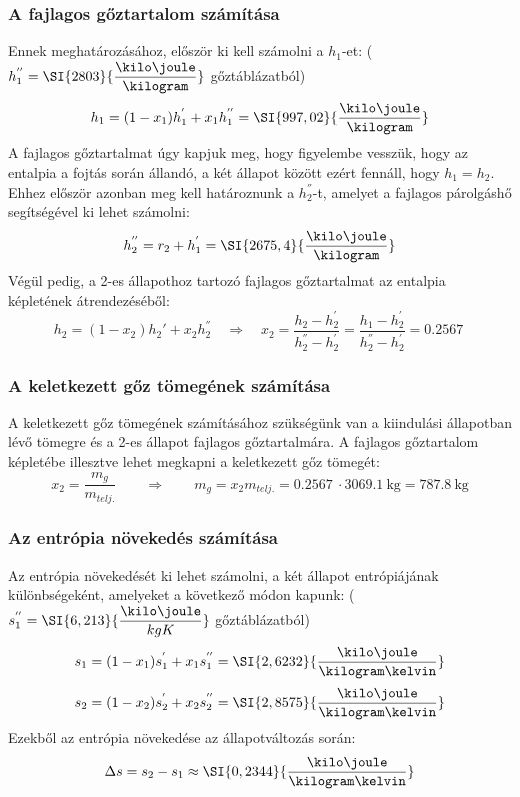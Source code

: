 \subsubsection{A fajlagos gőztartalom számítása}
Ennek meghatározásához, először ki kell számolni a $h_{1}$-et: ($h_{1}^{''} = \SI{2803}{\dfrac{\kilo\joule}{\kilogram}}$ gőztáblázatból)
\begin{equation}
	h_{1}
	=
	(1 - x_{1})h_{1}^{'} + x_{1}h_{1}^{''}
	=
	\SI{997,02}{\dfrac{\kilo\joule}{\kilogram}}
\end{equation}
A fajlagos gőztartalmat úgy kapjuk meg, hogy figyelembe vesszük, hogy az entalpia a fojtás során állandó, a két állapot között ezért fennáll, hogy $h_{1} = h_{2}$. Ehhez először azonban meg kell határoznunk a $h_{2}^{''}$-t, amelyet a fajlagos párolgáshő segítségével ki lehet számolni:
\begin{equation}
	h_{2}^{''} = r_{2} + h_{1}^{'}
	=
	\SI{2675,4}{\dfrac{\kilo\joule}{\kilogram}}
\end{equation}
Végül pedig, a 2-es állapothoz tartozó fajlagos gőztartalmat az entalpia képletének átrendezéséből:
\begin{equation}
	h_{2} = \left(1 - x_{2}\right) h_{2}' + x_{2} h_{2}^{''}
	\quad 
	\Rightarrow
	\quad 
	x_{2}
	= 
	\dfrac{h_{2} - h_{2}^{'}}{h_{2}^{''} - h_{2}^{'}} 
	=
	\dfrac{h_{1} - h_{2}^{'}}{h_{2}^{''} - h_{2}^{'}} 
	= 
	\SI{0,2567}{}
\end{equation}

\subsubsection{A keletkezett gőz tömegének számítása}
A keletkezett gőz tömegének számításához szükségünk van a kiindulási állapotban lévő tömegre és a 2-es állapot fajlagos gőztartalmára. A fajlagos gőztartalom képletébe illesztve lehet megkapni a keletkezett gőz tömegét:
\begin{equation}
	x_{2} = \dfrac{m_{g}}{m_{telj.}}
	\qquad
	\Rightarrow
	\qquad
	m_{g} = x_{2}m_{telj.}
	=
	\SI{0,2567}{}\cdot\SI{3069,1}{\kilogram}
	=
	\SI{787,8}{\kilogram}
\end{equation}


\subsubsection{Az entrópia növekedés számítása}
Az entrópia növekedését ki lehet számolni, a két állapot entrópiájának különbségeként, amelyeket a következő módon kapunk:
($s_{1}^{''} = \SI{6,213}{\dfrac{\kilo\joule}{kgK}}$ gőztáblázatból)
\begin{equation}
	s_{1}
	=
	(1-x_{1})s_{1}^{'} + x_{1}s_{1}^{''}
	=
	\SI{2,6232}{\dfrac{\kilo\joule}{\kilogram\kelvin}}
\end{equation}
\begin{equation}
	s_{2}
	=
	(1-x_{2})s_{2}^{'} + x_{2}s_{2}^{''}
	=
	\SI{2,8575}{\dfrac{\kilo\joule}{\kilogram\kelvin}}
\end{equation}
Ezekből az entrópia növekedése az állapotváltozás során:
\begin{equation}
	\Delta s = s_{2} - s_{1}\approx \SI{0,2344}{\dfrac{\kilo\joule}{\kilogram\kelvin}}
\end{equation}

